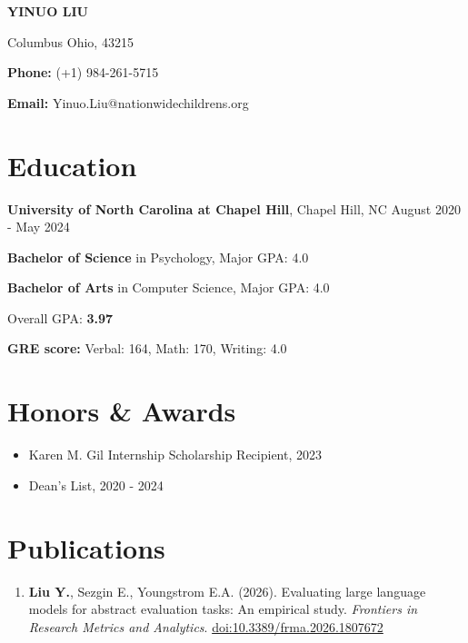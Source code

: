 \documentclass[12pt]{article}
\begin{document}
\begin{center}
    \large{\textbf{YINUO LIU}}

\end{center}

\begin{center}
    Columbus Ohio, 43215
    
    \textbf{Phone:} (+1) 984-261-5715
    
    \textbf{Email:} Yinuo.Liu@nationwidechildrens.org
\end{center}

\section{Education}
\textbf{University of North Carolina at Chapel Hill}, Chapel Hill, NC 
\hfill August 2020 - May 2024

\noindent \textbf{Bachelor of Science} in Psychology, Major GPA: 4.0
    
\noindent \textbf{Bachelor of Arts} in Computer Science, Major GPA: 4.0

\hspace{2em} Overall GPA: \textbf{3.97}

\hspace{2em} \textbf{GRE score:} Verbal: 164, Math: 170, Writing: 4.0

\section{Honors \& Awards}
\begin{itemize} [left=1em]
    \itemsep=-0.35em
    \item Karen M. Gil Internship Scholarship Recipient, 2023
    \item Dean's List, 2020 - 2024
\end{itemize}

\section{Publications}
\begin{enumerate}
    \item \textbf{Liu Y.}, Sezgin E., Youngstrom E.A. (2026). Evaluating large language models for abstract evaluation tasks: An empirical study. \textit{Frontiers in Research Metrics and Analytics}. \href{https://doi.org/10.3389/frma.2026.1807672}{doi:10.3389/frma.2026.1807672}
\end{enumerate}
\end{document}
